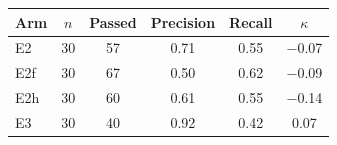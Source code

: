 \begin{tabular}{@{}lccccc@{}}
\toprule
Arm & $n$ & Passed & Precision & Recall & $\kappa$ \\
\midrule
E2 & 30 & 57 & 0.71 & 0.55 & $-$0.07 \\
E2f & 30 & 67 & 0.50 & 0.62 & $-$0.09 \\
E2h & 30 & 60 & 0.61 & 0.55 & $-$0.14 \\
E3 & 30 & 40 & 0.92 & 0.42 & 0.07 \\
\bottomrule
\end{tabular}
